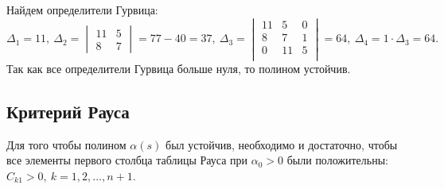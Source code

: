 \documentclass[../../TAU.tex]{subfiles}
\begin{document}
    Найдем определители Гурвица: 
    $$
    \Delta_1=11,\ \Delta_2 = 
    \begin{vmatrix}
        11 & 5\\
        8  & 7
    \end{vmatrix}
    =77 - 40=37,\ \Delta_3=
    \begin{vmatrix}
        11 & 5 & 0\\
        8  & 7 & 1\\
        0 & 11 & 5\\
    \end{vmatrix}
    =64,\ \Delta_4=1 \cdot \Delta_3=64.
    $$
    Так как все определители Гурвица больше нуля, то полином устойчив. 

\subsection{Критерий Рауса}

    \theor[Рауса] Для того чтобы полином 
    $\alpha(s)$ был устойчив, необходимо и достаточно, чтобы все элементы первого столбца таблицы Рауса при $\alpha_0 > 0$ были положительны: 
    $C_{k1}>0,\ k=1, 2,..., n+1$.
\end{document}
